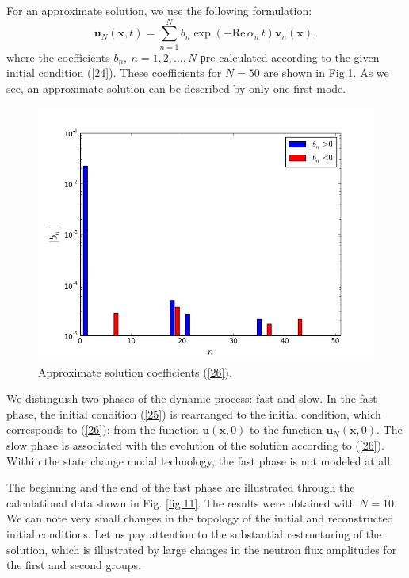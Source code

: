 \documentclass[authoryear]{elsarticle}
\begin{document}
For an approximate solution, we use the following formulation:
\begin{equation}\label{26}
 \bm u_N(\bm x, t) = 
 \sum_{n=1}^{N} b_n \exp(- \mathrm{Re} \, \alpha_n \, t) \bm v_n(\bm x) ,  
\end{equation} 
where the coefficients $b_n, \ n = 1,2, ..., N$ рre calculated according to the given initial condition (\ref{24}). These coefficients for $N=50$ are shown in Fig.\ref{fig:10}. 
As we see, an approximate solution can be described by only one first mode.

\begin{figure}[!h]
  \begin{center}
    \includegraphics[width=0.95\linewidth] {10.png}
	\caption{Approximate solution coefficients (\ref{26}).}
	\label{fig:10}
  \end{center}
\end{figure} 

We distinguish two phases of the dynamic process: fast and slow. In the fast phase, the initial condition (\ref{25}) 
is rearranged to the initial condition, which corresponds to (\ref{26}): from the function
$\bm u(\bm x, 0)$ to the function $\bm u_N(\bm x, 0)$. The slow phase is associated with the evolution of the solution according to (\ref{26}).
Within the state change modal technology, the fast phase is not modeled at all.

The beginning and the end of the fast phase are illustrated through the calculational data shown in Fig. \ref{fig:11}. The results were obtained with
 $N=10$. We can note very small changes in the topology of the initial and reconstructed initial conditions. Let us pay attention to the substantial restructuring of the solution, which is illustrated by large changes in the neutron flux amplitudes for the first and second groups.
\end{document}
